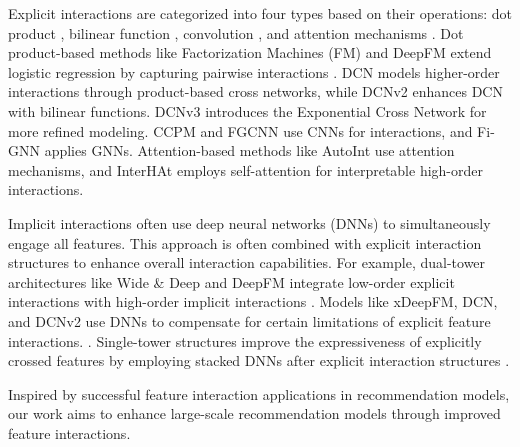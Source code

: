 Explicit interactions are categorized into four types based on their operations: dot product \cite{fm,deepfm,pnn,dcn}, bilinear function \cite{dcnv2,xdeepfm,dcnv3}, convolution \cite{ccpm,liu2019FGCNN,li2019fi-gnn, zhang2019graph, zhang2022hierarchical, zhang2022cglb, zhang2020context, wang2019mcne}, and attention mechanisms \cite{song2019autoint,li2020interhat}. Dot product-based methods like Factorization Machines (FM) and DeepFM extend logistic regression by capturing pairwise interactions \cite{fm, deepfm}. DCN \cite{dcn} models higher-order interactions through product-based cross networks, while DCNv2 \cite{dcnv2} enhances DCN with bilinear functions. DCNv3 \cite{dcnv3} introduces the Exponential Cross Network for more refined modeling. CCPM \cite{ccpm} and FGCNN \cite{liu2019FGCNN} use CNNs for interactions, and Fi-GNN \cite{li2019fi-gnn} applies GNNs. Attention-based methods like AutoInt \cite{song2019autoint} use attention mechanisms, and InterHAt \cite{li2020interhat} employs self-attention for interpretable high-order interactions.

Implicit interactions often use deep neural networks (DNNs) \cite{zhang2016dnn} to simultaneously engage all features. This approach is often combined with explicit interaction structures to enhance overall interaction capabilities. For example, dual-tower architectures like Wide \& Deep and DeepFM integrate low-order explicit interactions with high-order implicit interactions \cite{cheng2016wideanddeep, deepfm}. Models like xDeepFM, DCN, and DCNv2 use DNNs to compensate for certain limitations of explicit feature interactions. \cite{xdeepfm, dcn, dcnv2}. Single-tower structures improve the expressiveness of explicitly crossed features by employing stacked DNNs after explicit interaction structures \cite{he2017nfm, pnn, qu2018pin}.

Inspired by successful feature interaction applications in recommendation models, our work aims to enhance large-scale recommendation models through improved feature interactions.


